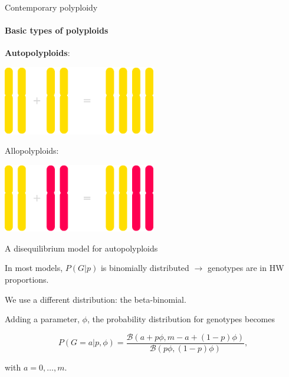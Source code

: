 \documentclass[presentation,sansserif,12pt]{beamer}
\begin{document}
\begin{frame}[t]{Contemporary polyploidy}
\framesubtitle{Basic types of polyploids}


	\begin{tcolorbox}[colframe=itemcol, colback=white!30!black, coltext=white!95!black]
	\textbf{Autopolyploids}:

	\begin{center}
		\includegraphics[width=0.5\textwidth]{eps/autopolyploid-formation}
	\end{center}
	
	\end{tcolorbox}
	
	Allopolyploids:
	
	\begin{center}
		{\includegraphics[width=0.5\textwidth]{eps/allopolyploid-formation}}
	\end{center}

\end{frame}

\begin{frame}[t]{A disequilibrium model for autopolyploids}

  In most models, $P(G|p)$ is binomially distributed $\rightarrow$ genotypes are in HW proportions.
  \vspace{0.3in}
  \pause
  
  We use a different distribution: the beta-binomial.
  \vspace{0.3in}
  \pause
  
  Adding a parameter, $\phi$, the probability distribution for genotypes becomes
  \vspace{0.1in}
  
  \begin{equation}
    P(G=a|p,\phi) = \frac{\mathcal{B}(a + p\phi, m - a + (1-p)\phi)}{\mathcal{B}(p\phi, (1-p)\phi)},
  \end{equation}

with $a = 0,\dots,m$.
  
  \end{frame}
  
\end{document}
